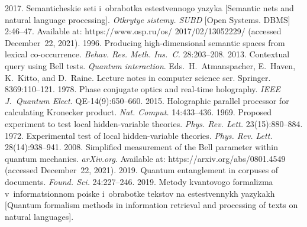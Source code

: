 \begin{multicols}{2}
{{\begin{thebibliography}{99}
 2017. Semanticheskie seti i~obrabotka estestvennogo yazyka [Semantic nets and natural 
language processing].
\textit{Otkrytye sistemy. SUBD} [Open Systems. DBMS] 2:46--47.
 Available at: {\sf https://www.osp.ru/os/ 2017/02/13052229/} (accessed December~22, 
2021).
 1996. Producing high-dimensional semantic spaces from lexical  
co-occurrence. \textit{Behav. Res. Meth. Ins.~C.} 28:203--208.
 2013. Contextual query using Bell tests. 
\textit{Quantum interaction}. Eds.\ H.~Atmanspacher, E.~Haven, K.~Kitto, and D.~Raine.
 Lecture notes in computer science ser. 
Springer. 8369:110--121.
 1978. Phase conjugate optics and real-time holography. \textit{IEEE J.~Quantum 
Elect.} QE-14(9):650--660.
 2015. Holographic parallel processor for calculating Kronecker 
product. \textit{Nat. Comput.} 14:433--436.
 1969. Proposed experiment to test local 
hidden-variable theories. \textit{Phys. Rev. Lett.} 23(15):880--884.
 1972. Experimental test of local hidden-variable theories. 
\textit{Phys. Rev. Lett.} 28(14):938--941.
 2008. Simplified measurement of the Bell parameter 
within quantum mechanics. \textit{arXiv.org}. Available at: {\sf https://arxiv.org/abs/0801.4549} (accessed 
December~22, 2021).
 2019. Quantum entanglement in corpuses of documents. 
\textit{Found. Sci.} 24:227--246.
2019. Metody kvantovogo formalizma v~informatsionnom poiske i~obrabotke tekstov na estestvennykh 
yazykakh [Quantum formalism methods in information retrieval and processing of texts on natural languages]. 

\end{thebibliography}}}
\end{multicols}
